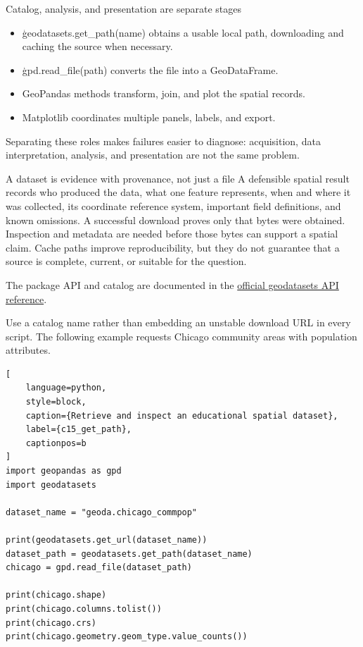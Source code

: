 \begin{SyntaxBox}{Catalog, analysis, and presentation are separate stages}
\begin{itemize}
    \item \c{geodatasets.get_path(name)} obtains a usable local path, downloading
          and caching the source when necessary.
    \item \c{gpd.read_file(path)} converts the file into a GeoDataFrame.
    \item GeoPandas methods transform, join, and plot the spatial records.
    \item Matplotlib coordinates multiple panels, labels, and export.
\end{itemize}
Separating these roles makes failures easier to diagnose: acquisition, data
interpretation, analysis, and presentation are not the same problem.
\end{SyntaxBox}

\begin{ExplainBox}{A dataset is evidence with provenance, not just a file}
A defensible spatial result records who produced the data, what one feature
represents, when and where it was collected, its coordinate reference system,
important field definitions, and known omissions. A successful download proves
only that bytes were obtained. Inspection and metadata are needed before those
bytes can support a spatial claim. Cache paths improve reproducibility, but
they do not guarantee that a source is complete, current, or suitable for the
question.
\end{ExplainBox}

The package API and catalog are documented in the
\href{https://geodatasets.readthedocs.io/en/latest/api.html}{official geodatasets API reference}.


Use a catalog name rather than embedding an unstable download URL in every
script. The following example requests Chicago community areas with population
attributes.

\begin{lstlisting}[
    language=python,
    style=block,
    caption={Retrieve and inspect an educational spatial dataset},
    label={c15_get_path},
    captionpos=b
]
import geopandas as gpd
import geodatasets

dataset_name = "geoda.chicago_commpop"

print(geodatasets.get_url(dataset_name))
dataset_path = geodatasets.get_path(dataset_name)
chicago = gpd.read_file(dataset_path)

print(chicago.shape)
print(chicago.columns.tolist())
print(chicago.crs)
print(chicago.geometry.geom_type.value_counts())
\end{lstlisting}

